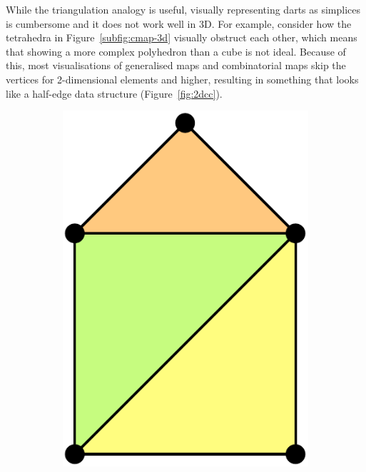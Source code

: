 While the triangulation analogy is useful, visually representing darts as simplices is cumbersome and it does not work well in 3D.
For example, consider how the tetrahedra in Figure~\ref{subfig:cmap-3d} visually obstruct each other, which means that showing a more complex polyhedron than a cube is not ideal.
Because of this, most visualisations of generalised maps and combinatorial maps skip the vertices for 2-dimensional elements and higher, resulting in something that looks like a half-edge data structure (Figure~\ref{fig:2dcc}).

\begin{figure}
\centering
\begin{subfigure}{0.33\linewidth}
\includegraphics[scale=0.7]{figs/2dcc}
\caption{}%
\label{subfig:2dcc}
\end{subfigure}%
\quad
\begin{subfigure}{0.33\linewidth}

\end{subfigure}
\end{figure}
